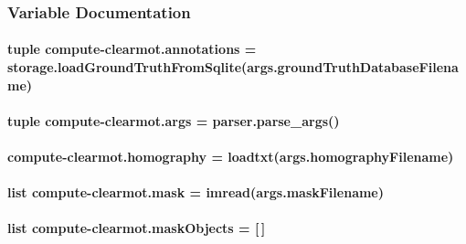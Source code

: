 \subsubsection{Variable Documentation}
\hypertarget{namespacecompute-clearmot_a1778137e8796b2628575fc799ae04556}{
\paragraph[{annotations}]{\setlength{\rightskip}{0pt plus 5cm}tuple compute-\/clearmot.\-annotations = {\bf storage.\-load\-Ground\-Truth\-From\-Sqlite}(args.\-ground\-Truth\-Database\-Filename)}}\label{namespacecompute-clearmot_a1778137e8796b2628575fc799ae04556}
\hypertarget{namespacecompute-clearmot_a47a5abb52dee7ddad848f2fad0a0b9b5}{
\paragraph[{args}]{\setlength{\rightskip}{0pt plus 5cm}tuple compute-\/clearmot.\-args = parser.\-parse\-\_\-args()}}\label{namespacecompute-clearmot_a47a5abb52dee7ddad848f2fad0a0b9b5}
\hypertarget{namespacecompute-clearmot_a5edb0e829730c5829319525b889bd397}{
\paragraph[{homography}]{\setlength{\rightskip}{0pt plus 5cm}compute-\/clearmot.\-homography = loadtxt(args.\-homography\-Filename)}}\label{namespacecompute-clearmot_a5edb0e829730c5829319525b889bd397}
\hypertarget{namespacecompute-clearmot_ae649842464dfab87258a46f244b71ca3}{
\paragraph[{mask}]{\setlength{\rightskip}{0pt plus 5cm}list compute-\/clearmot.\-mask = imread(args.\-mask\-Filename)}}\label{namespacecompute-clearmot_ae649842464dfab87258a46f244b71ca3}
\hypertarget{namespacecompute-clearmot_a4f294254ea03e7d3752d568cb63dc734}{
\paragraph[{mask\-Objects}]{\setlength{\rightskip}{0pt plus 5cm}list compute-\/clearmot.\-mask\-Objects = \mbox{[}$\,$\mbox{]}}}\label{namespacecompute-clearmot_a4f294254ea03e7d3752d568cb63dc734}
